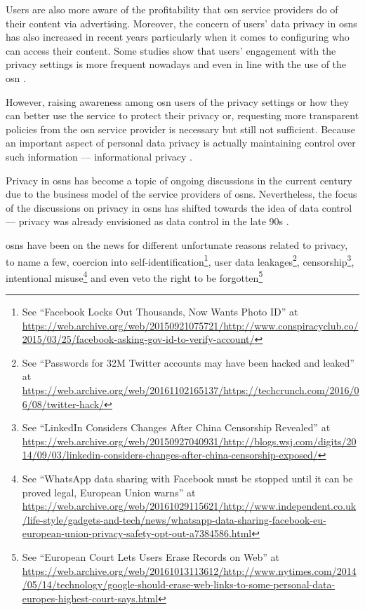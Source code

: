 \documentclass[showtrims]{kthesis}
\begin{document}
Users are also more aware of the profitability that \ac{osn} service providers do 
of their content via advertising. Moreover, the concern of users' data privacy in 
\acp{osn} has also increased in recent years particularly when it comes to configuring 
who can access their content. Some studies show that users' engagement with the 
privacy settings is more frequent nowadays and even in line with the use of the 
\ac{osn} \cite{boydH10}.

However, raising awareness among \ac{osn} users of the privacy settings or how they 
can better use the service to protect their privacy or, requesting more transparent 
policies from the \ac{osn} service provider is necessary but still not sufficient. 
Because an important aspect of personal data privacy is actually maintaining control 
over such information --- informational privacy \cite{Cavoukian96}.

Privacy in \acp{osn} has become a topic of ongoing discussions in the current century 
due to the business model of the service providers of \acp{osn}. Nevertheless, the 
focus of the discussions on privacy in \acp{osn} has shifted towards the idea of 
data control --- privacy was already envisioned as data control in the late 90s 
\cite{Allen99}.

\acp{osn} have been on the news for different unfortunate reasons related to privacy, 
to name a few, coercion into self-identification\footnote{See ``Facebook Locks Out Thousands, Now Wants Photo ID'' at \url{https://web.archive.org/web/20150921075721/http://www.conspiracyclub.co/2015/03/25/facebook-asking-gov-id-to-verify-account/}}, 
user data leakages\footnote{See ``Passwords for 32M Twitter accounts may have been hacked and leaked'' at \url{https://web.archive.org/web/20161102165137/https://techcrunch.com/2016/06/08/twitter-hack/}}, 
censorship\footnote{See ``LinkedIn Considers Changes After China Censorship Revealed'' at \url{https://web.archive.org/web/20150927040931/http://blogs.wsj.com/digits/2014/09/03/linkedin-considers-changes-after-china-censorship-exposed/}}, 
intentional misuse\footnote{See ``WhatsApp data sharing with Facebook must be stopped until it can be proved legal, European Union warns'' at \url{https://web.archive.org/web/20161029115621/http://www.independent.co.uk/life-style/gadgets-and-tech/news/whatsapp-data-sharing-facebook-eu-european-union-privacy-safety-opt-out-a7384586.html}} and 
even veto the right to be forgotten\footnote{See ``European Court Lets Users Erase Records on Web'' at \url{https://web.archive.org/web/20161013113612/http://www.nytimes.com/2014/05/14/technology/google-should-erase-web-links-to-some-personal-data-europes-highest-court-says.html}}
\end{document}
